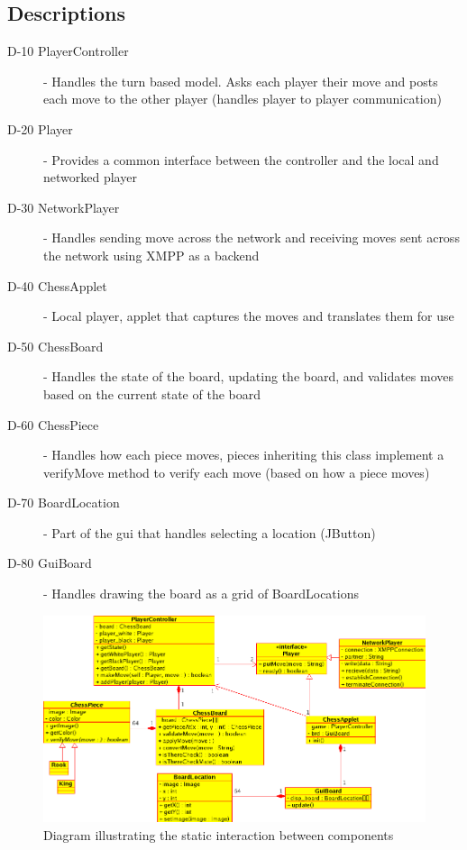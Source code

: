 \subsection{Descriptions}
\begin{description}
\item[D-10 PlayerController] - Handles the turn based model. Asks each player their move and posts each move to the other player (handles player to player communication)
\item[D-20 Player] - Provides a common interface between the controller and the local and networked player
\item[D-30 NetworkPlayer] - Handles sending move across the network and receiving moves sent across the network using XMPP as a backend
\item[D-40 ChessApplet] - Local player, applet that captures the moves and translates them for use
\item[D-50 ChessBoard] - Handles the state of the board, updating the board, and validates moves based on the current state of the board
\item[D-60 ChessPiece] - Handles how each piece moves, pieces inheriting this class implement a verifyMove method to verify each move (based on how a piece moves)
\item[D-70 BoardLocation] - Part of the gui that handles selecting a location (JButton)
\item[D-80 GuiBoard] - Handles drawing the board as a grid of BoardLocations


\end{description}
\begin{figure}[H]
   \centering
   \includegraphics[angle=90,scale=0.85]{cdiagram.png}
   \caption{Diagram illustrating the static interaction between components}
  \end{figure}
